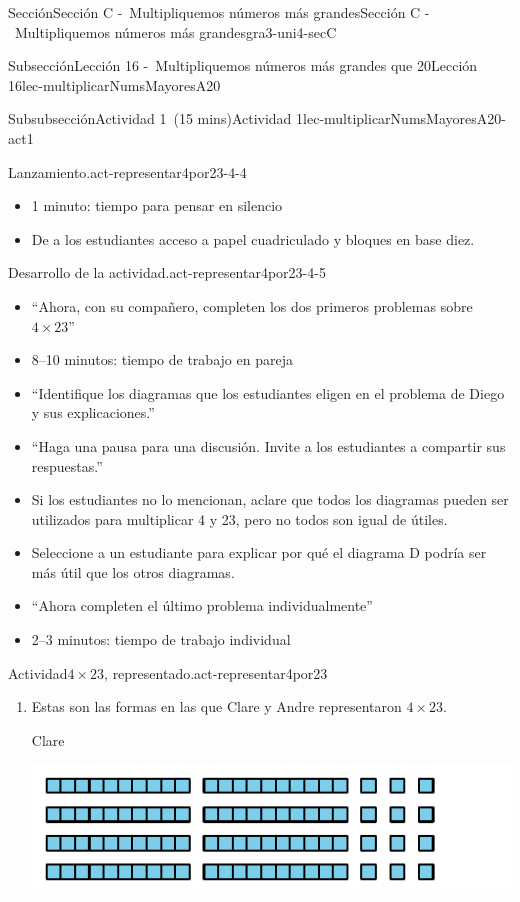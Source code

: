 \documentclass[oneside,10pt,]{article}
\begin{document}
\begin{sectionptx}{Sección}{Sección C -~Multipliquemos números más grandes}{}{Sección C -~Multipliquemos números más grandes}{}{}{gra3-uni4-secC}
\begin{subsectionptx}{Subsección}{Lección 16 -~Multipliquemos números más grandes que 20}{}{Lección 16}{}{}{lec-multiplicarNumsMayoresA20}
\begin{subsubsectionptx}{Subsubsección}{Actividad 1~(15 mins)}{}{Actividad 1}{}{}{lec-multiplicarNumsMayoresA20-act1}
\begin{paragraphs}{Lanzamiento.}{act-representar4por23-4-4}
\begin{itemize}[label=\textbullet]
\item{}1 minuto: tiempo para pensar en silencio%
\item{}De a los estudiantes acceso a papel cuadriculado y bloques en base diez.%
\end{itemize}
\end{paragraphs}%
\begin{paragraphs}{Desarrollo de la actividad.}{act-representar4por23-4-5}%
%
\begin{itemize}[label=\textbullet]
\item{}``Ahora, con su compañero, completen los dos primeros problemas sobre \(4 \times 23\)''%
\item{}8–10 minutos: tiempo de trabajo en pareja%
\item{}``Identifique los diagramas que los estudiantes eligen en el problema de Diego y sus explicaciones.''%
\item{}``Haga una pausa para una discusión. Invite a los estudiantes a compartir sus respuestas.''%
\item{}Si los estudiantes no lo mencionan, aclare que todos los diagramas pueden ser utilizados para multiplicar 4 y 23, pero no todos son igual de útiles.%
\item{}Seleccione a un estudiante para explicar por qué el diagrama D podría ser más útil que los otros diagramas.%
\item{}``Ahora completen el último problema individualmente''%
\item{}2–3 minutos: tiempo de trabajo individual%
\end{itemize}
\end{paragraphs}%
\begin{activity}{Actividad}{\(4\times 23\), representado.}{act-representar4por23}%
%
\begin{enumerate}
\item{}Estas son las formas en las que Clare y Andre representaron \(4\times 23\).%
\begin{sidebyside}{2}{0}{0}{0}%
\begin{sbspanel}{0.5}%
Clare%
\par
\includegraphics[width=\linewidth]{external/svg-source/tikz-file-152969-scale13.pdf}

\end{sbspanel}
\end{sidebyside}
\end{enumerate}
\end{activity}
\end{subsubsectionptx}
\end{subsectionptx}
\end{sectionptx}
\end{document}
